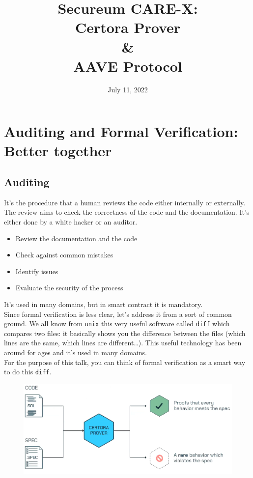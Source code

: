 \documentclass[oneside]{book}
\title{\Huge\textbf{Secureum CARE-X:\\Certora Prover\\\&\\AAVE Protocol}}
\date{July 11, 2022}
\begin{document}
    \maketitle

    \chapter{Auditing and Formal Verification: Better together}

    \section{Auditing}

    It's the procedure that a human reviews the code either internally or externally.
    The review aims to check the correctness of the code and the documentation.
    It's either done by a white hacker or an auditor.

    \begin{itemize}
        \item Review the documentation and the code
        \item Check against common mistakes
        \item Identify issues
        \item Evaluate the security of the process
    \end{itemize}

    It's used in many domains, but in smart contract it is mandatory.\\

    Since formal verification is less clear, let's address it from a sort of common ground.
    We all know from \texttt{unix} this very useful software called \texttt{diff} which compares two files: it basically shows you the difference between the files (which lines are the same, which lines are different\dots).
    This useful technology has been around for ages and it's used in many domains.\\

    For the purpose of this talk, you can think of formal verification as a smart way to do this \texttt{diff}.

    \begin{figure}[htbp!]
        \centering
        \includegraphics[width=\linewidth]{img/formal_verification_diff}
    \end{figure}
\end{document}
